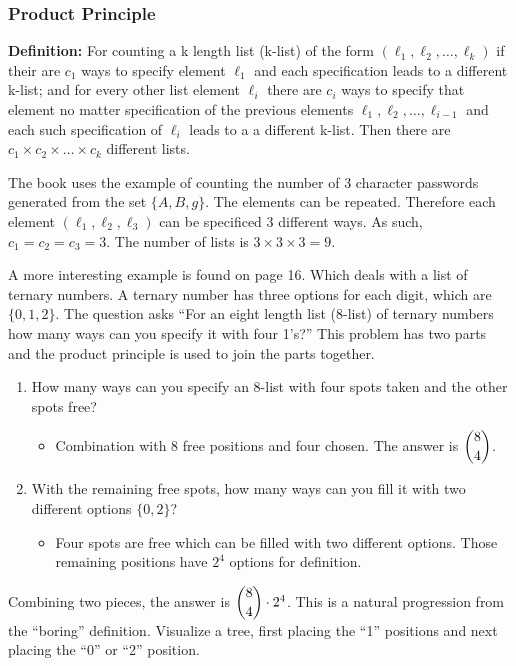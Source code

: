 \documentclass{article}
\begin{document}
\subsubsection{Product Principle}

\textbf{Definition:} For counting a k length list (k-list) of the form $(\ell_1, \ell_2, \dots, \ell_k)$ if their are $c_1$ ways to specify element $\ell_1$ and each specification leads to a different k-list; and for every other list element $\ell_i$ there are $c_i$ ways to specify that element no matter specification of the previous elements $\ell_1, \ell_2, \dots, \ell_{i-1}$ and each such specification of $\ell_i$ leads to a a different k-list. Then there are $c_1 \times c_2 \times \dots \times c_k$ different lists. \medskip

The book uses the example of counting the number of 3 character passwords generated from the set $\{A, B, g\}$. The elements can be repeated. Therefore each element $(\ell_1, \ell_2, \ell_3)$ can be specificed 3 different ways. As such, $c_1 = c_2 = c_3 = 3$. The number of lists is $3 \times 3 \times 3 = 9$. \medskip

A more interesting example is found on page 16. Which deals with a list of ternary numbers. A ternary number has three options for each digit, which are $\{0, 1, 2\}$. The question asks ``For an eight length list (8-list) of ternary numbers how many ways can you specify it with four 1's?'' This problem has two parts and the product principle is used to join the parts together.

\begin{enumerate}
    \item How many ways can you specify an 8-list with four spots taken and the other spots free?
    \begin{itemize}
        \item Combination with 8 free positions and four chosen. The answer is $\dbinom{8}{4}$.
    \end{itemize}
    \item With the remaining free spots, how many ways can you fill it with two different options $\{0, 2\}$?
    \begin{itemize}
        \item Four spots are free which can be filled with two different options. Those remaining positions have $2^4$ options for definition.
    \end{itemize}
\end{enumerate}

Combining two pieces, the answer is $\dbinom{8}{4} \cdot 2^{4}$. This is a natural progression from the ``boring'' definition. Visualize a tree, first placing the ``1'' positions and next placing the ``0'' or ``2'' position.
\end{document}
